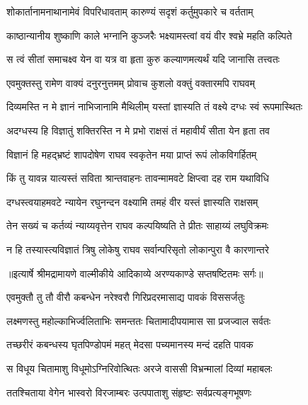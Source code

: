 \twolineshloka
{शोकार्तानामनाथानामेवं विपरिधावताम्}
{कारुण्यं सदृशं कर्तुमुपकारे च वर्तताम्} %

\twolineshloka
{काष्ठान्यानीय शुष्काणि काले भग्नानि कुञ्जरैः}
{भक्ष्यामस्त्वां वयं वीर श्वभ्रे महति कल्पिते} %

\twolineshloka
{स त्वं सीतां समाचक्ष्व येन वा यत्र वा हृता}
{कुरु कल्याणमत्यर्थं यदि जानासि तत्त्वतः} %

\twolineshloka
{एवमुक्तस्तु रामेण वाक्यं दनुरनुत्तमम्}
{प्रोवाच कुशलो वक्तुं वक्तारमपि राघवम्} %

\twolineshloka
{दिव्यमस्ति न मे ज्ञानं नाभिजानामि मैथिलीम्}
{यस्तां ज्ञास्यति तं वक्ष्ये दग्धः स्वं रूपमास्थितः} %

\twolineshloka
{अदग्धस्य हि विज्ञातुं शक्तिरस्ति न मे प्रभो}
{राक्षसं तं महावीर्यं सीता येन हृता तव} %

\twolineshloka
{विज्ञानं हि महद्भ्रष्टं शापदोषेण राघव}
{स्वकृतेन मया प्राप्तं रूपं लोकविगर्हितम्} %

\twolineshloka
{किं तु यावन्न यात्यस्तं सविता श्रान्तवाहनः}
{तावन्मामवटे क्षिप्त्वा दह राम यथाविधि} %

\twolineshloka
{दग्धस्त्वयाहमवटे न्यायेन रघुनन्दन}
{वक्ष्यामि तमहं वीर यस्तं ज्ञास्यति राक्षसम्} %

\twolineshloka
{तेन सख्यं च कर्तव्यं न्याय्यवृत्तेन राघव}
{कल्पयिष्यति ते प्रीतः साहाय्यं लघुविक्रमः} %

\twolineshloka
{न हि तस्यास्त्यविज्ञातं त्रिषु लोकेषु राघव}
{सर्वान्परिसृतो लोकान्पुरा वै कारणान्तरे} %


{॥इत्यार्षे श्रीमद्रामायणे वाल्मीकीये आदिकाव्ये अरण्यकाण्डे सप्तषष्टितमः सर्गः॥}


\twolineshloka
{एवमुक्तौ तु तौ वीरौ कबन्धेन नरेश्वरौ}
{गिरिप्रदरमासाद्य पावकं विससर्जतुः} %

\twolineshloka
{लक्ष्मणस्तु महोल्काभिर्ज्वलिताभिः समन्ततः}
{चितामादीपयामास सा प्रजज्वाल सर्वतः} %

\twolineshloka
{तच्छरीरं कबन्धस्य घृतपिण्डोपमं महत्}
{मेदसा पच्यमानस्य मन्दं दहति पावक} %

\twolineshloka
{स विधूय चितामाशु विधूमोऽग्निरिवोत्थितः}
{अरजे वाससी विभ्रन्मालां दिव्यां महाबलः} %

\twolineshloka
{ततश्चिताया वेगेन भास्वरो विरजाम्बरः}
{उत्पपाताशु संहृष्टः सर्वप्रत्यङ्गभूषणः} %

